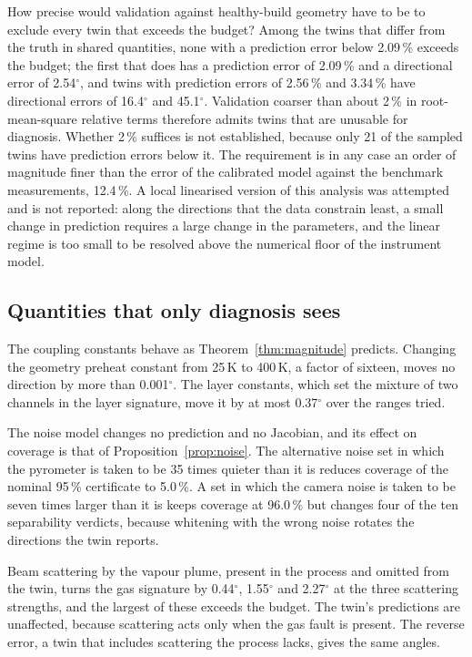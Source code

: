 \documentclass[preprint,12pt]{elsarticle}
\begin{document}
How precise would validation against healthy-build geometry have to be to
exclude every twin that exceeds the budget? Among the twins that differ from the
truth in shared quantities, none with a prediction error below 2.09\,\% exceeds
the budget; the first that does has a prediction error of 2.09\,\% and a
directional error of 2.54$^\circ$, and twins with prediction errors of
2.56\,\% and 3.34\,\% have directional errors of 16.4$^\circ$ and 45.1$^\circ$.
Validation coarser than about 2\,\% in root-mean-square relative terms therefore
admits twins that are unusable for diagnosis. Whether 2\,\% suffices is not
established, because only 21 of the sampled twins have prediction errors below
it. The requirement is in any case an order of magnitude finer than the error of
the calibrated model against the benchmark measurements, 12.4\,\%. A local
linearised version of this analysis was attempted and is not reported: along
the directions that the data constrain least, a small change in prediction
requires a large change in the parameters, and the linear regime is too small to
be resolved above the numerical floor of the instrument model.

\subsection{Quantities that only diagnosis sees}
\label{sec:diagnosis-only}

The coupling constants behave as Theorem~\ref{thm:magnitude} predicts.
Changing the geometry preheat constant from 25\,K to 400\,K, a factor of
sixteen, moves no direction by more than 0.001$^\circ$. The layer constants,
which set the mixture of two channels in the layer signature, move it by at most
0.37$^\circ$ over the ranges tried.

The noise model changes no prediction and no Jacobian, and its effect on
coverage is that of Proposition~\ref{prop:noise}. The alternative noise set in
which the pyrometer is taken to be 35 times quieter than it is reduces coverage
of the nominal 95\,\% certificate to 5.0\,\%. A set in which the camera noise is
taken to be seven times larger than it is keeps coverage at 96.0\,\% but changes
four of the ten separability verdicts, because whitening with the wrong noise
rotates the directions the twin reports.

Beam scattering by the vapour plume, present in the process and omitted from
the twin, turns the gas signature by 0.44$^\circ$, 1.55$^\circ$ and
2.27$^\circ$ at the three scattering strengths, and the largest of these exceeds
the budget. The twin's predictions are unaffected, because scattering acts only
when the gas fault is present. The reverse error, a twin that includes
scattering the process lacks, gives the same angles.
\end{document}

